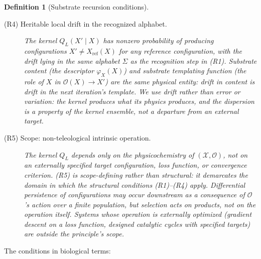 \documentclass[aps,prx,reprint,amsmath,amssymb,floatfix,superscriptaddress,nofootinbib]{revtex4-2}
\theoremstyle{plain-thm}
\theoremstyle{definition-thm}
\newtheorem{definition}[theorem]{Definition}
\newcommand{\descX}{\varphi_X}
\newcommand{\Xset}{\mathcal{X}}
\newcommand{\Op}{\mathcal{O}}
\begin{document}
\begin{definition}[Substrate recursion conditions]
\begin{description}
\item[(R4) Heritable local drift in the recognized alphabet.] The kernel $Q_L(X' \mid X)$ has nonzero probability of producing configurations $X' \neq X_{\mathrm{ref}}(X)$ for any reference configuration, with the drift lying in the same alphabet $\Sigma$ as the recognition step in (R1). Substrate content (the descriptor $\descX(X)$) and substrate templating function (the role of $X$ in $\Op(X) \to X'$) are the same physical entity: drift in content is drift in the next iteration's template. We use \emph{drift} rather than \emph{error} or \emph{variation}: the kernel produces what its physics produces, and the dispersion is a property of the kernel ensemble, not a departure from an external target.

\item[(R5) Scope: non-teleological intrinsic operation.] The kernel $Q_L$ depends only on the physicochemistry of $(\Xset, \Op)$, not on an externally specified target configuration, loss function, or convergence criterion. (R5) is scope-defining rather than structural: it demarcates the domain in which the structural conditions (R1)--(R4) apply. Differential persistence of configurations may occur downstream as a consequence of $\Op$'s action over a finite population, but selection acts on products, not on the operation itself. Systems whose operation is externally optimized (gradient descent on a loss function, designed catalytic cycles with specified targets) are outside the principle's scope.
\end{description}
\end{definition}

The conditions in biological terms:
\end{document}
